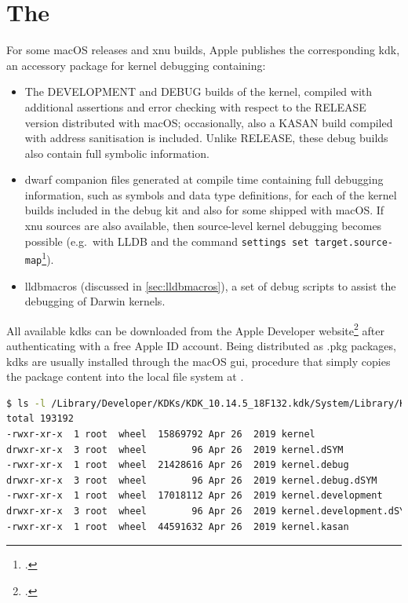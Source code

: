 \section{The }\label{sec:kdk}
For some macOS releases and \gls{xnu} builds, Apple publishes the corresponding \gls{kdk}, an accessory package for kernel debugging containing:
\begin{itemize}
    \item The DEVELOPMENT and DEBUG builds of the kernel, compiled with additional assertions and error checking with respect to the RELEASE version distributed with macOS; occasionally, also a KASAN build compiled with address sanitisation is included. Unlike RELEASE, these debug builds also contain full symbolic information.
    \item \gls{dwarf} companion files generated at compile time containing full debugging information, such as symbols and data type definitions, for each of the kernel builds included in the debug kit and also for some  shipped with macOS. If \gls{xnu} sources are also available, then source-level kernel debugging becomes possible (e.g.\ with LLDB and the command \lstinline{settings set target.source-map}\footcite{MacOSDebug9}).
    \item lldbmacros (discussed in \cref{sec:lldbmacros}), a set of debug scripts to assist the debugging of Darwin kernels.
\end{itemize}

All available \glspl{kdk} can be downloaded from the Apple Developer website\footcite{AppleKDK} after authenticating with a free Apple ID account. Being distributed as .pkg packages, \glspl{kdk} are usually installed through the macOS \gls{gui}, procedure that simply copies the package content into the local file system at .

\begin{lstlisting}[style=out,language=bash,caption={Kernels builds from the \gls{kdk} for macOS 10.14.5 Mojave build 18F132}]
$ ls -l /Library/Developer/KDKs/KDK_10.14.5_18F132.kdk/System/Library/Kernels/
total 193192
-rwxr-xr-x  1 root  wheel  15869792 Apr 26  2019 kernel
drwxr-xr-x  3 root  wheel        96 Apr 26  2019 kernel.dSYM
-rwxr-xr-x  1 root  wheel  21428616 Apr 26  2019 kernel.debug
drwxr-xr-x  3 root  wheel        96 Apr 26  2019 kernel.debug.dSYM
-rwxr-xr-x  1 root  wheel  17018112 Apr 26  2019 kernel.development
drwxr-xr-x  3 root  wheel        96 Apr 26  2019 kernel.development.dSYM
-rwxr-xr-x  1 root  wheel  44591632 Apr 26  2019 kernel.kasan
\end{lstlisting}

